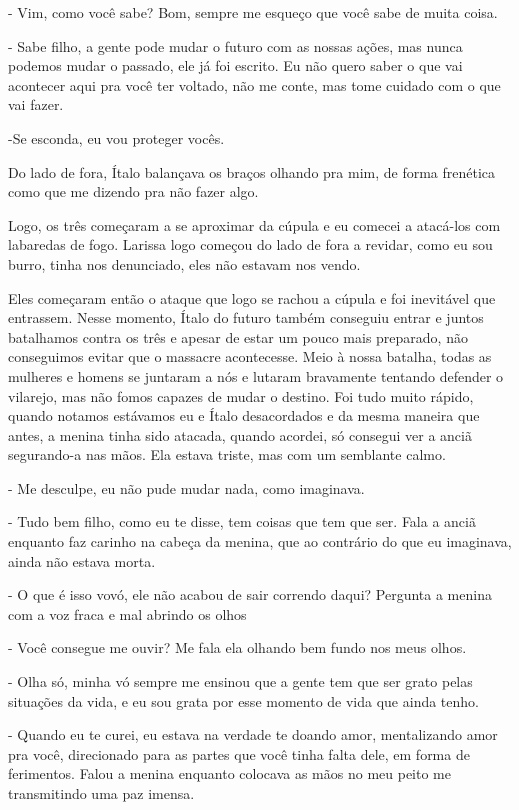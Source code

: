 - Vim, como você sabe? Bom, sempre me esqueço que você sabe de muita coisa.

- Sabe filho, a gente pode mudar o futuro com as nossas ações, mas nunca podemos mudar o passado, ele já foi escrito. Eu não quero saber o que vai acontecer aqui pra você ter voltado, não me conte, mas tome cuidado com o que vai fazer.

-Se esconda, eu vou proteger vocês.

Do lado de fora, Ítalo balançava os braços olhando pra mim, de forma frenética como que me dizendo pra não fazer algo.

Logo, os três começaram a se aproximar da cúpula e eu comecei a atacá-los com labaredas de fogo. Larissa logo começou do lado de fora a revidar, como eu sou burro, tinha nos denunciado, eles não estavam nos vendo.

Eles começaram então o ataque que logo se rachou a cúpula e foi inevitável que entrassem. Nesse momento, Ítalo do futuro também conseguiu entrar e juntos batalhamos contra os três e apesar de estar um pouco mais preparado, não conseguimos evitar que o massacre acontecesse. Meio à nossa batalha, todas as mulheres e homens se juntaram a nós e lutaram bravamente tentando defender o vilarejo, mas não fomos capazes de mudar o destino. Foi tudo muito rápido, quando notamos estávamos eu e Ítalo desacordados e da mesma maneira que antes, a menina tinha sido atacada, quando acordei, só consegui ver a anciã segurando-a nas mãos. Ela estava triste, mas com um semblante calmo.

- Me desculpe, eu não pude mudar nada, como imaginava.

- Tudo bem filho, como eu te disse, tem coisas que tem que ser. Fala a anciã enquanto faz carinho na cabeça da menina, que ao contrário do que eu imaginava, ainda não estava morta.

- O que é isso vovó, ele não acabou de sair correndo daqui? Pergunta a menina com a voz fraca e mal abrindo os olhos

- Você consegue me ouvir? Me fala ela olhando bem fundo nos meus olhos.

- Olha só, minha vó sempre me ensinou que a gente tem que ser grato pelas situações da vida, e eu sou grata por esse momento de vida que ainda tenho.

- Quando eu te curei, eu estava na verdade te doando amor, mentalizando amor pra você, direcionado para as partes que você tinha falta dele, em forma de ferimentos. Falou a menina enquanto colocava as mãos no meu peito me transmitindo uma paz imensa.

